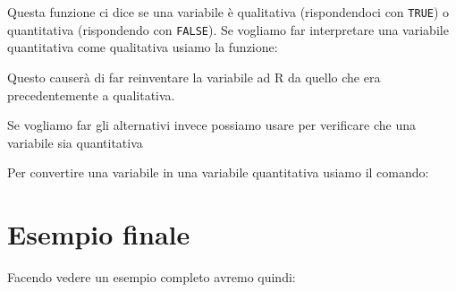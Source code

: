 

Questa funzione ci dice se una variabile è qualitativa (rispondendoci con
\texttt{TRUE}) o quantitativa (rispondendo con \texttt{FALSE}). Se vogliamo far
interpretare una variabile quantitativa come qualitativa usiamo la funzione:



Questo causerà di far reinventare la variabile ad R da quello che era
precedentemente a qualitativa.

Se vogliamo far gli alternativi invece possiamo usare per verificare che una
variabile sia quantitativa



Per convertire una variabile in una variabile quantitativa usiamo il comando:



\section{Esempio finale}

Facendo vedere un esempio completo avremo quindi:


